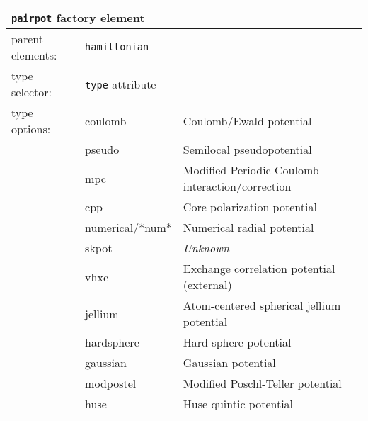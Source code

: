 \FloatBarrier
\begin{table}[h]
\begin{center}
\begin{tabularx}{\textwidth}{l l l l l l }
\hline
\multicolumn{6}{l}{\texttt{pairpot} factory element} \\
\hline
\multicolumn{2}{l}{parent elements:} & \multicolumn{4}{l}{\texttt{hamiltonian}}\\
\multicolumn{2}{l}{type   selector:} & \multicolumn{4}{l}{\texttt{type} attribute}\\
\multicolumn{2}{l}{type   options: } & \multicolumn{2}{l}{coulomb           } & \multicolumn{2}{l}{Coulomb/Ewald potential}\\
\multicolumn{2}{l}{                } & \multicolumn{2}{l}{pseudo            } & \multicolumn{2}{l}{Semilocal pseudopotential}\\
\multicolumn{2}{l}{                } & \multicolumn{2}{l}{mpc               } & \multicolumn{2}{l}{Modified Periodic Coulomb interaction/correction}\\
\multicolumn{2}{l}{                } & \multicolumn{2}{l}{cpp               } & \multicolumn{2}{l}{Core polarization potential}\\
\multicolumn{2}{l}{                } & \multicolumn{2}{l}{numerical/*num*   } & \multicolumn{2}{l}{Numerical radial potential}\\
\multicolumn{2}{l}{                } & \multicolumn{2}{l}{skpot             } & \multicolumn{2}{l}{\textit{Unknown}}\\
\multicolumn{2}{l}{                } & \multicolumn{2}{l}{vhxc              } & \multicolumn{2}{l}{Exchange correlation potential (external)}\\
\multicolumn{2}{l}{                } & \multicolumn{2}{l}{jellium           } & \multicolumn{2}{l}{Atom-centered spherical jellium potential}\\
\multicolumn{2}{l}{                } & \multicolumn{2}{l}{hardsphere        } & \multicolumn{2}{l}{Hard sphere potential}\\
\multicolumn{2}{l}{                } & \multicolumn{2}{l}{gaussian          } & \multicolumn{2}{l}{Gaussian potential}\\
\multicolumn{2}{l}{                } & \multicolumn{2}{l}{modpostel         } & \multicolumn{2}{l}{Modified Poschl-Teller potential}\\
\multicolumn{2}{l}{                } & \multicolumn{2}{l}{huse              } & \multicolumn{2}{l}{Huse quintic potential}\\

\end{tabularx}
\end{center}
\end{table}
